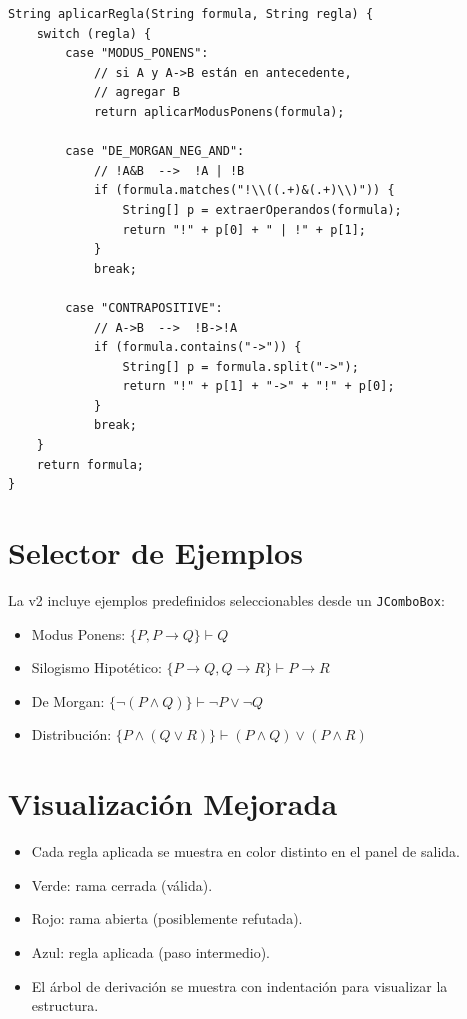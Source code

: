 \documentclass[12pt,a4paper]{article}
\begin{document}
\begin{lstlisting}
String aplicarRegla(String formula, String regla) {
    switch (regla) {
        case "MODUS_PONENS":
            // si A y A->B están en antecedente,
            // agregar B
            return aplicarModusPonens(formula);

        case "DE_MORGAN_NEG_AND":
            // !A&B  -->  !A | !B
            if (formula.matches("!\\((.+)&(.+)\\)")) {
                String[] p = extraerOperandos(formula);
                return "!" + p[0] + " | !" + p[1];
            }
            break;

        case "CONTRAPOSITIVE":
            // A->B  -->  !B->!A
            if (formula.contains("->")) {
                String[] p = formula.split("->");
                return "!" + p[1] + "->" + "!" + p[0];
            }
            break;
    }
    return formula;
}
\end{lstlisting}

\section{Selector de Ejemplos}

La v2 incluye ejemplos predefinidos seleccionables desde un \texttt{JComboBox}:

\begin{itemize}
  \item Modus Ponens: $\{P, P \rightarrow Q\} \vdash Q$
  \item Silogismo Hipotético: $\{P \rightarrow Q, Q \rightarrow R\} \vdash P \rightarrow R$
  \item De Morgan: $\{\neg(P \wedge Q)\} \vdash \neg P \vee \neg Q$
  \item Distribución: $\{P \wedge (Q \vee R)\} \vdash (P \wedge Q) \vee (P \wedge R)$
\end{itemize}

\section{Visualización Mejorada}

\begin{itemize}
  \item Cada regla aplicada se muestra en color distinto en el panel de salida.
  \item Verde: rama cerrada (válida).
  \item Rojo: rama abierta (posiblemente refutada).
  \item Azul: regla aplicada (paso intermedio).
  \item El árbol de derivación se muestra con indentación para visualizar la estructura.
\end{itemize}
\end{document}

